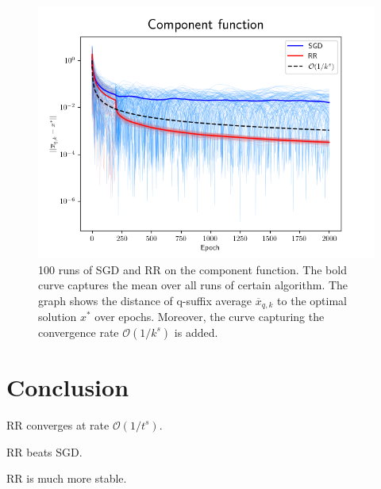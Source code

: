 \documentclass[10pt,conference,compsocconf]{IEEEtran}
\begin{document}
\begin{figure}
  \centering
  \includegraphics[width=\columnwidth]{component_runs}
  \caption{100 runs of SGD and RR on the component function.
   The bold curve captures the mean over all runs of certain algorithm.
   The graph shows the distance of q-suffix average
   $\overline{x}_{q,k}$ to the optimal solution $x^*$ over
   epochs. Moreover, the curve capturing the convergence rate
   $\mathcal{O}(1 / k^s)$ is added.}
  \vspace{-3mm}
  \label{fig:sphere1}
\end{figure}

\section*{Conclusion}

RR converges at rate $\mathcal{O}(1 / t^s)$.

RR beats SGD.

RR is much more stable.

\newpage


\end{document}
